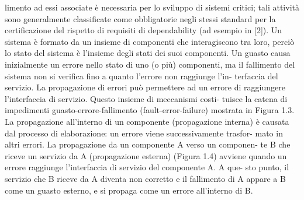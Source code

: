 \documentclass[14pt]{extarticle}
\begin{document}
limento ad essi associate è necessaria per lo sviluppo di sistemi critici; tali
attività sono generalmente classificate come obbligatorie negli stessi standard
per la certificazione del rispetto di requisiti di dependability (ad esempio in
[2]).
Un sistema è formato da un insieme di componenti che interagiscono tra
loro, perciò lo stato del sistema è l’insieme degli stati dei suoi componenti. Un
guasto causa inizialmente un errore nello stato di uno (o più) componenti, ma
il fallimento del sistema non si verifica fino a quanto l’errore non raggiunge l’in-
terfaccia del servizio. La propagazione di errori può permettere ad un errore
di raggiungere l’interfaccia di servizio. Questo insieme di meccanismi costi-
tuisce la catena di impedimenti guasto-errore-fallimento (fault-error-failure)
mostrata in Figura 1.3.
La propagazione all’interno di un componente (propagazione interna) è
causata dal processo di elaborazione: un errore viene successivamente trasfor-
mato in altri errori. La propagazione da un componente A verso un componen-
te B che riceve un servizio da A (propagazione esterna) (Figura 1.4) avviene
quando un errore raggiunge l’interfaccia di servizio del componente A. A que-
sto punto, il servizio che B riceve da A diventa non corretto e il fallimento di
A appare a B come un guasto esterno, e si propaga come un errore all’interno
di B.
\end{document}
